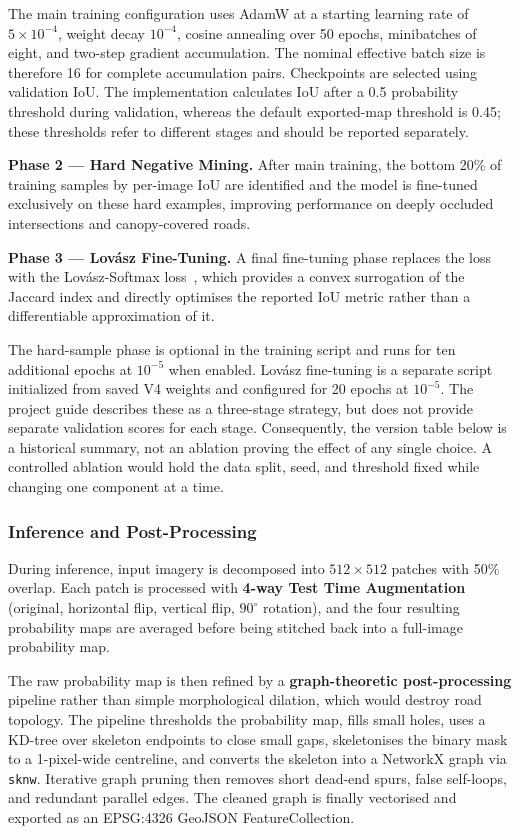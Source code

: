 \documentclass[10pt,a4paper,twocolumn]{article}
\begin{document}
The main training configuration uses AdamW at a starting learning rate of $5\times10^{-4}$, weight decay $10^{-4}$, cosine annealing over 50 epochs, minibatches of eight, and two-step gradient accumulation. The nominal effective batch size is therefore 16 for complete accumulation pairs. Checkpoints are selected using validation IoU. The implementation calculates IoU after a 0.5 probability threshold during validation, whereas the default exported-map threshold is 0.45; these thresholds refer to different stages and should be reported separately.

\textbf{Phase 2 --- Hard Negative Mining.} After main training, the
bottom 20\% of training samples by per-image IoU are identified and
the model is fine-tuned exclusively on these hard examples, improving
performance on deeply occluded intersections and canopy-covered roads.

\textbf{Phase 3 --- Lov\'{a}sz Fine-Tuning.} A final fine-tuning phase
replaces the loss with the Lov\'{a}sz-Softmax loss~\cite{b15}, which
provides a convex surrogation of the Jaccard index and directly
optimises the reported IoU metric rather than a differentiable
approximation of it.

The hard-sample phase is optional in the training script and runs for ten additional epochs at $10^{-5}$ when enabled. Lov\'{a}sz fine-tuning is a separate script initialized from saved V4 weights and configured for 20 epochs at $10^{-5}$. The project guide describes these as a three-stage strategy, but does not provide separate validation scores for each stage. Consequently, the version table below is a historical summary, not an ablation proving the effect of any single choice. A controlled ablation would hold the data split, seed, and threshold fixed while changing one component at a time.

\subsubsection{Inference and Post-Processing}

During inference, input imagery is decomposed into $512 \times 512$
patches with 50\% overlap. Each patch is processed with \textbf{4-way
Test Time Augmentation} (original, horizontal flip, vertical flip,
$90^{\circ}$ rotation), and the four resulting probability maps are
averaged before being stitched back into a full-image probability map.

The raw probability map is then refined by a \textbf{graph-theoretic
post-processing} pipeline rather than simple morphological dilation,
which would destroy road topology. The pipeline thresholds the
probability map, fills small holes, uses a KD-tree over skeleton
endpoints to close small gaps, skeletonises the binary mask to a
1-pixel-wide centreline, and converts the skeleton into a NetworkX
graph via \texttt{sknw}. Iterative graph pruning then removes short
dead-end spurs, false self-loops, and redundant parallel edges. The
cleaned graph is finally vectorised and exported as an EPSG:4326
GeoJSON FeatureCollection.
\end{document}
